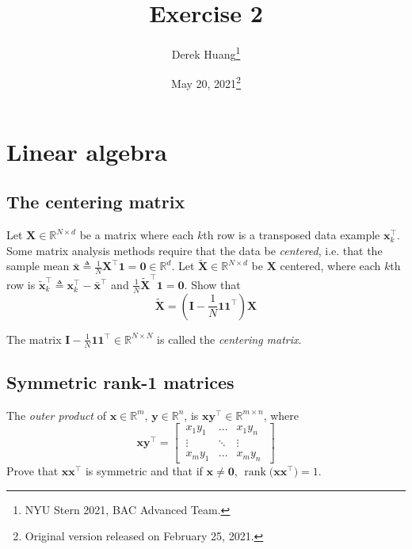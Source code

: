 \documentclass{article}
\title{Exercise 2}
\author{Derek Huang\thanks{NYU Stern 2021, BAC Advanced Team.}}
\date{May 20, 2021\thanks{Original version released on February 25, 2021.}}
\numberwithin{equation}{section}
\begin{document}
\maketitle
\thispagestyle{fancy}

\section{Linear algebra}

\subsection{The centering matrix}

Let $ \mathbf{X} \in \mathbb{R}^{N \times d} $ be a matrix where each $ k $th
row is a transposed data example $ \mathbf{x}_k^\top $. Some matrix analysis
methods require that the data be \textit{centered}, i.e. that the sample mean
$ \bar{\mathbf{x}} \triangleq \frac{1}{N}\mathbf{X}^\top\mathbf{1} =
\mathbf{0} \in \mathbb{R}^d $. Let $ \tilde{\mathbf{X}} \in
\mathbb{R}^{N \times d} $ be $ \mathbf{X} $ centered, where each $ k $th row
is $ \tilde{\mathbf{x}}_k^\top \triangleq \mathbf{x}_k^\top -
\bar{\mathbf{x}}^\top $ and $ \frac{1}{N}\tilde{\mathbf{X}}^\top\mathbf{1}
= \mathbf{0} $. Show that 
\begin{equation*}
    \tilde{\mathbf{X}} = \left(
        \mathbf{I} - \frac{1}{N}\mathbf{11}^\top
    \right)\mathbf{X}
\end{equation*}

The matrix $ \mathbf{I} - \frac{1}{N}\mathbf{11}^\top \in
\mathbb{R}^{N \times N} $ is called the \textit{centering matrix}.

\subsection{Symmetric rank-1 matrices}

The \textit{outer product} of $ \mathbf{x} \in \mathbb{R}^m $,
$ \mathbf{y} \in \mathbb{R}^n $, is $ \mathbf{xy}^\top \in
\mathbb{R}^{m \times n} $, where
\begin{equation*}
    \mathbf{xy}^\top = \begin{bmatrix}
        \ x_1y_1 & \ldots & x_1y_n \ \\
        \ \vdots & \ddots & \vdots \ \\
        \ x_my_1 & \ldots & x_my_n \
    \end{bmatrix}
\end{equation*}
Prove that $ \mathbf{xx}^\top $ is symmetric and that if $ \mathbf{x} \ne
\mathbf{0} $, $ \operatorname{rank}\big(\mathbf{xx}^\top\big) = 1 $.
\end{document}
